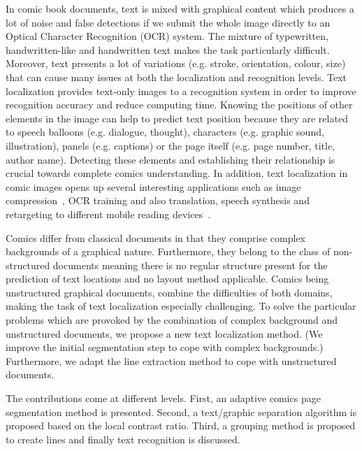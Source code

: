 In comic book documents, text is mixed with graphical content which produces a lot of noise and false detections if we submit the whole image directly to an Optical Character Recognition (OCR) system.
The mixture of typewritten, handwritten-like and handwritten text makes the task particularly difficult.
Moreover, text presents a lot of variations (e.g. stroke, orientation, colour, size) that can cause many issues at both the localization and recognition levels.
Text localization provides text-only images to a recognition system in order to improve recognition accuracy and reduce computing time.
Knowing the positions of other elements in the image can help to predict text position because they are related to speech balloons (e.g. dialogue, thought), characters (e.g. graphic sound, illustration), panels (e.g. captions) or the page itself (e.g. page number, title, author name).
Detecting these elements and establishing their relationship is crucial towards complete comics understanding.
In addition, text localization in comic images opens up several interesting applications such as image compression~\cite{Su11}, OCR training and also translation, speech synthesis and retargeting to different mobile reading devices~\cite{Matsui2011}.

Comics differ from classical documents in that they comprise complex backgrounds of a graphical nature. Furthermore, they belong to the class of non-structured documents meaning there is no regular structure present for the prediction of text locations and no layout method applicable.
Comics being unstructured graphical documents, combine the difficulties of both domains, making the task of text localization especially challenging.
To solve the particular problems which are provoked by the combination of complex background and unstructured documents, we propose a new text localization method.
(We improve the initial segmentation step to cope with complex backgrounds.) Furthermore, we adapt the line extraction method to cope with unstructured documents.





The contributions come at different levels. First, an adaptive comics page segmentation method is presented. Second, a text/graphic separation algorithm is proposed based on the local contrast ratio. Third, a grouping method is proposed to create lines and finally text recognition is discussed.

